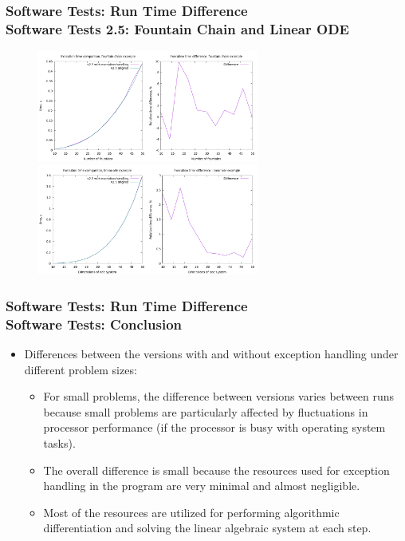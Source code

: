 \documentclass[ucs,10pt]{beamer}
\begin{document}
\begin{frame}
\frametitle{Software Tests: Run Time Difference \\
	\small \color{rwth-blue} Software Tests 2.5: Fountain Chain and Linear ODE}
	\begin{figure}
		\centering
		\includegraphics[width=0.65\textwidth]{figures/2.5_fountain_chain.png}
		\vspace{0.3cm}
		\includegraphics[width=0.65\textwidth]{figures/2.5_linear_ode.png}
	\end{figure}
\end{frame}
	
\begin{frame}
\frametitle{Software Tests: Run Time Difference \\
	\small \color{rwth-blue} Software Tests: Conclusion}
	\begin{itemize}
		\item Differences between the versions with and without exception handling under different problem sizes:
		\begin{itemize}
			\item For small problems, the difference between versions varies between runs because small problems are particularly affected by fluctuations in processor performance (if the processor is busy with operating system tasks).
			\item The overall difference is small because the resources used for exception handling in the program are very minimal and almost negligible. 
			\item Most of the resources are utilized for performing algorithmic differentiation and solving the linear algebraic system at each step.
		\end{itemize}
	\end{itemize}
\end{frame}
			
\end{document}
